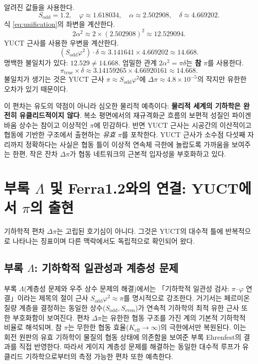\documentclass[11pt,a4paper]{article}
\begin{document}
	알려진 값들을 사용한다.
	\[
	S_{\mathrm{odd}} = 1.2, \quad \varphi \approx 1.618034, \quad \alpha \approx 2.502908, \quad \delta \approx 4.669202.
	\]
	식 \eqref{eq:unification}의 좌변을 계산한다.
	\[
	2\alpha^2 \approx 2 \times (2.502908)^2 \approx 12.529094.
	\]
	YUCT 근사를 사용한 우변을 계산한다.
	\[
	(S_{\mathrm{odd}}\varphi^2) \cdot \delta \approx 3.141641 \times 4.669202 \approx 14.668.
	\]
	명백한 불일치가 있다: \(12.529 \neq 14.668\). 엄밀한 관계 \(2\alpha^2 = \pi \delta\)는 \textbf{참} \(\pi\)를 사용한다.
	\[
	\pi_{\mathrm{true}} \times \delta \approx 3.14159265 \times 4.66920161 \approx 14.668.
	\]
	불일치가 생기는 것은 YUCT 근사 \(\pi \approx S_{\mathrm{odd}}\varphi^2\)에 \(\Delta\pi \approx 4.8\times10^{-5}\)의 작지만 유한한 오차가 있기 때문이다.
	
	이 편차는 유도의 약점이 아니라 심오한 물리적 예측이다: \textbf{물리적 세계의 기하학은 완전히 유클리드적이지 않다}. 복소 평면에서의 재규격화군 흐름의 보편적 성질인 파이겐바움 상수는 참이고 이상적인 \(\pi\)에 민감하다. 반면 YUCT 근사는 시공간의 이산적이고 협동에 기반한 구조에서 출현하는 \textit{유효} \(\pi\)를 포착한다. YUCT 근사가 소수점 다섯째 자리까지 정확하다는 사실은 협동 틀이 이상적 연속체 극한에 놀랍도록 가까움을 보여주는 한편, 작은 잔차 \(\Delta\pi\)가 협동 네트워크의 근본적 입자성을 부호화하고 있다.
	
	\section{부록 \(\Lambda\) 및 Ferra1.2와의 연결: YUCT에서 \(\pi\)의 출현}
	
	기하학적 편차 \(\Delta\pi\)는 고립된 호기심이 아니다. 그것은 YUCT의 대수적 틀에 반복적으로 나타나는 징표이며 다른 맥락에서도 독립적으로 확인되어 왔다.
	
	\subsection{부록 \(\Lambda\): 기하학적 일관성과 계층성 문제}
	
	부록 \(\Lambda\)(계층성 문제와 우주 상수 문제의 해결)에서는 「기하학적 일관성 검사: \(\pi\)–\(\varphi\) 연결」이라는 제목의 절이 근사 \(S_{\mathrm{odd}}\varphi^2 \approx \pi\)를 명시적으로 강조한다. 거기서는 페르미온 질량 계층을 결정하는 동일한 상수(\(S_{\mathrm{odd}}, S_{\mathrm{even}}\))가 연속적 기하학의 최적 유한 근사 또한 부호화함이 보여진다. 편차 \(\Delta\pi\)는 유한한 협동 구조를 가진 계의 기본적 기하학적 비율로 해석되며, 참 \(\pi\)는 무한한 협동 효율(\(K_{\mathrm{eff}} \to \infty\))의 극한에서만 복원된다. 이는 회전 원판의 유효 기하학이 물질의 협동 상태에 의존함을 보여준 부록 Ehrenfest의 결과를 직접 반영한다. 따라서 게이지 계층성 문제를 해결하는 동일한 대수적 루프가 유클리드 기하학으로부터의 측정 가능한 편차 또한 예측한다.
	
\end{document}
